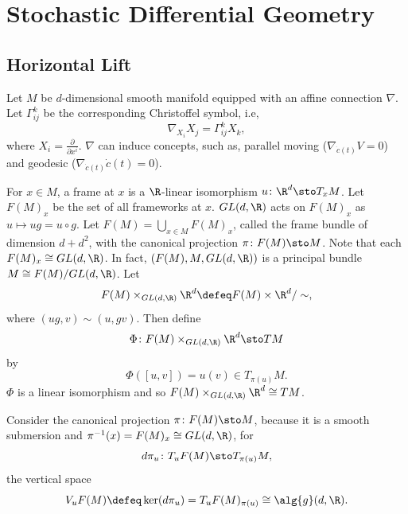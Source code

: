 \chapter{Stochastic Differential Geometry}

\section{Horizontal Lift}

Let $M$ be $d$-dimensional smooth manifold equipped with an affine connection $\nabla$. Let $\Gamma^k_{ij}$ be the corresponding Christoffel symbol, i.e,
\begin{equation*}
    \nabla_{X_i}X_j = \Gamma^k_{ij}X_k,
\end{equation*}
where $X_i = \frac{\partial}{\partial x^i}$. $\nabla$ can induce concepts, such as, parallel moving ($\nabla_{\dot{c}(t)}V = 0$) and geodesic ($\nabla_{\dot{c}(t)}\dot{c}(t) = 0$).

For $x \in M$, a frame at $x$ is a $\R$-linear isomorphism $u \colon \R^d \sto T_xM$. Let $F(M)_x$ be the set of all frameworks at $x$. $GL(d,\R)$ acts on $F(M)_x$ as $u \mapsto ug = u \circ g$. Let $F(M) = \bigcup_{x\in M} F(M)_x$, called the frame bundle of dimension $d + d^2$, with the canonical projection $\pi \colon F(M) \sto M$. Note that each $F(M)_x \cong GL(d,\R)$. In fact, $(F(M),M,GL(d,\R))$ is a principal bundle $M \cong F(M) / GL(d,\R)$. Let
\begin{equation*}
    F(M) \times_{GL(d,\R)} \R^d \defeq F(M) \times \R^d / \sim,
\end{equation*}
where $(ug,v) \sim (u,gv)$. Then define
\begin{equation*}
    \Phi \colon F(M) \times_{GL(d,\R)} \R^d \sto TM
\end{equation*}
by
\begin{equation*}
    \Phi([u,v]) = u(v) \in T_{\pi(u)}M.
\end{equation*}
$\Phi$ is a linear isomorphism and so $F(M) \times_{GL(d,\R)} \R^d \cong TM$.

Consider the canonical projection $\pi \colon F(M) \sto M$, because it is a smooth submersion and $\pi^{-1}({x}) = F(M)_x \cong GL(d,\R)$, for
\begin{equation*}
    d\pi_u \colon T_uF(M) \sto T_{\pi(u)}M,
\end{equation*}
the vertical space
\begin{equation*}
    V_uF(M) \defeq \ker(d\pi_u) = T_u F(M)_{\pi(u)} \cong \alg{g}(d,\R).
\end{equation*}

